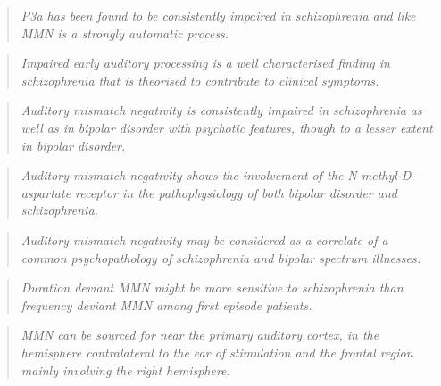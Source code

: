 \begin{quotation}
	\textit{P3a has been found to be consistently impaired in schizophrenia and like MMN is a strongly automatic process.}
	\begin{flushright}
		\cite{grillon1990increased}\cite{jahshan2012automatic}\cite{koshiyama2022neuroimaging}
	\end{flushright}
\end{quotation}
\begin{quotation}
	\textit{Impaired early auditory processing is a well characterised finding in schizophrenia that is theorised to contribute to clinical symptoms.}
	\begin{flushright}
		\cite{kim2020neurophysiological}
	\end{flushright}
\end{quotation}
\begin{quotation}
	\textit{Auditory mismatch negativity is consistently impaired in schizophrenia as well as in bipolar disorder with psychotic features, though to a lesser extent in bipolar disorder.}
	\begin{flushright}
		\cite{raggi2022auditory}
	\end{flushright}
\end{quotation}
\begin{quotation}
	\textit{Auditory mismatch negativity shows the involvement of the N-methyl-D-aspartate receptor in the pathophysiology of both bipolar disorder and schizophrenia.}
	\begin{flushright}
		\cite{raggi2022auditory}
	\end{flushright}
\end{quotation}
\begin{quotation}
	\textit{Auditory mismatch negativity may be considered as a correlate of a common psychopathology of schizophrenia and bipolar spectrum illnesses.}
	\begin{flushright}
		\cite{raggi2022auditory}
	\end{flushright}
\end{quotation}
\begin{quotation}
	\textit{Duration deviant MMN might be more sensitive to schizophrenia than frequency deviant MMN among first episode patients.}
	\begin{flushright}
		\cite{umbricht2005mismatch}
	\end{flushright}
\end{quotation}
\begin{quotation}
	\textit{MMN can be sourced for near the primary auditory cortex, in the hemisphere contralateral to the ear of stimulation and the frontal region mainly involving the right hemisphere.}
	\begin{flushright}
		\cite{raggi2022auditory}
	\end{flushright}
\end{quotation}
